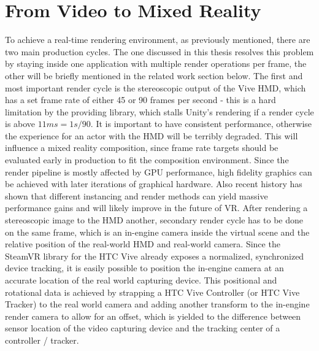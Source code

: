 %
\chapter{From Video to Mixed Reality}
\label{chap:video2mr}


To achieve a real-time rendering environment, as previously mentioned, there 
are two main production cycles. The one discussed in this thesis resolves this 
problem by staying inside one application with multiple render operations per 
frame, the other will be briefly mentioned in the related work section below. 
\newline
The first and most important render cycle is the stereoscopic output of the 
Vive HMD, which has a set frame rate of either 45 or 90 frames per second - 
this is a hard limitation by the providing library, which stalls Unity's 
rendering if a render cycle is above $11ms = 1s / 90$. It is important to have 
consistent performance, otherwise the experience for an actor with the HMD will 
be terribly degraded. This will influence a mixed reality composition, since 
frame rate targets should be evaluated early in production to fit the 
composition environment. Since the render pipeline is mostly affected by GPU 
performance, high fidelity graphics can be achieved with later iterations of 
graphical hardware. Also recent history has shown that different instancing and 
render methods can yield massive performance gains and will likely improve in 
the future of VR\cite{oculus:improv-render:2016}.
\newline
After rendering a stereoscopic image to the HMD another, secondary render cycle 
has to be done on the same frame, which is an in-engine camera inside the 
virtual scene and the relative position of the real-world HMD and real-world 
camera. Since the SteamVR library for the HTC Vive already exposes a 
normalized, synchronized device tracking, it is easily possible to position the 
in-engine camera at an accurate location of the real world capturing device. 
This positional and rotational data is achieved by strapping a HTC Vive 
Controller (or HTC Vive Tracker) to the real world camera and adding another 
transform to the in-engine render camera to allow for an offset, which is 
yielded to the difference between sensor location of the video capturing device 
and the tracking center of a controller / tracker.

